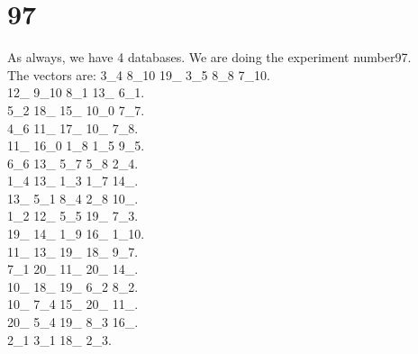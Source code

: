 \chapter{97}
\indent As always, we have 4 databases. We are doing the experiment number97.\\
The vectors are:
3\_4 8\_10 19\_ 3\_5 8\_8 7\_10.\\12\_ 9\_10 8\_1 13\_ 6\_1.\\5\_2 18\_ 15\_ 10\_0 7\_7.\\4\_6 11\_ 17\_ 10\_ 7\_8.\\11\_ 16\_0 1\_8 1\_5 9\_5.\\6\_6 13\_ 5\_7 5\_8 2\_4.\\1\_4 13\_ 1\_3 1\_7 14\_.\\13\_ 5\_1 8\_4 2\_8 10\_.\\1\_2 12\_ 5\_5 19\_ 7\_3.\\19\_ 14\_ 1\_9 16\_ 1\_10.\\11\_ 13\_ 19\_ 18\_ 9\_7.\\7\_1 20\_ 11\_ 20\_ 14\_.\\10\_ 18\_ 19\_ 6\_2 8\_2.\\10\_ 7\_4 15\_ 20\_ 11\_.\\20\_ 5\_4 19\_ 8\_3 16\_.\\2\_1 3\_1 18\_ 2\_3.\\